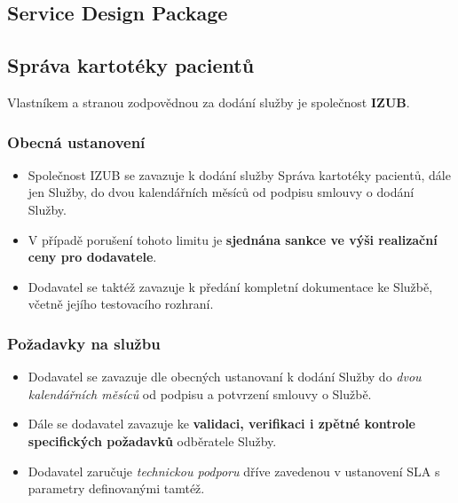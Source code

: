 \documentclass[11pt, a4paper, titlepage]{article}
\begin{document}
	
	\pagestyle{fancy}

	\begin{center}
		\section*{Service Design Package}
	\end{center}

	\subsection*{Správa kartotéky pacientů}

	Vlastníkem a stranou zodpovědnou za dodání služby je společnost \textbf{IZUB}. 

	\subsubsection*{Obecná ustanovení}

	\begin{itemize}
		\item Společnost IZUB se zavazuje k dodání služby Správa kartotéky pacientů, dále jen Služby, do dvou kalendářních měsíců od podpisu smlouvy o dodání Služby.
		\item V případě porušení tohoto limitu je \textbf{sjednána sankce ve výši realizační ceny pro dodavatele}.
		\item Dodavatel se taktéž zavazuje k předání kompletní dokumentace ke Službě, včetně jejího testovacího rozhraní.
	\end{itemize}

	\subsubsection*{Požadavky na službu}

	\begin{itemize}
		\item Dodavatel se zavazuje dle obecných ustanovaní k dodání Služby do \emph{dvou kalendářních měsíců} od podpisu a potvrzení smlouvy o Službě. 
		\item Dále se dodavatel zavazuje ke \textbf{validaci, verifikaci i zpětné kontrole specifických požadavků} odběratele Služby.
		\item Dodavatel zaručuje \emph{technickou podporu} dříve zavedenou v ustanovení SLA s parametry definovanými tamtéž.
	\end{itemize}
\end{document}

